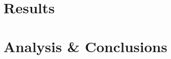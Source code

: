 \documentclass{uvamscse}	%
\begin{document}

\chapter{Results}
\label{results}


\chapter{Analysis \& Conclusions}
\label{conclusions}





\newpage

\end{document}
